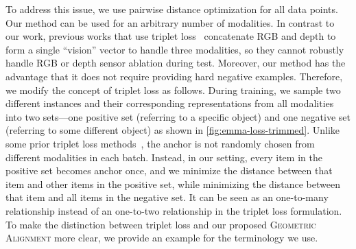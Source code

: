 \documentclass[10pt]{article} %
\newcommand{\todokdinline}[1]{\todo[color=red!20,inline]{{KD: \small #1}}}
\newcommand{\todoffinline}[1]{\todo[inline,color=blue!20]{\small #1 -- Frank}}
\newcommand{\geom}{\textsc{Geometric Alignment}}
\begin{document}
To address this issue, we use pairwise distance optimization for all data points. %
Our method can be used for an arbitrary number of modalities. %
In contrast to our work, previous works that use triplet loss~\citep{GoLD_UMBC,triplet_loss_2021_CVPR} concatenate RGB and depth to form a single ``vision'' vector to handle three modalities, so they cannot robustly handle RGB or depth sensor ablation during test.
Moreover, our method has the advantage that it does not require providing hard negative examples.
Therefore, we modify the concept of triplet loss as follows. During training, we sample two different instances and their corresponding representations from all modalities into two sets---one positive set (referring to a specific object) and one negative set (referring to some different object) as shown in \cref{fig:emma-loss-trimmed}.
Unlike some prior triplet loss methods~\citep{GoLD_UMBC,triplet_loss_2021_CVPR}, the anchor is not randomly chosen from different modalities in each batch. Instead, in our setting, every item in the positive set becomes anchor once, and we minimize the distance between that item and other items in the positive set, while minimizing the distance between that item and all items in the negative set. It can be seen as an one-to-many relationship instead of an one-to-two relationship in the triplet loss formulation.
To make the distinction between triplet loss and our proposed \geom{} more clear, we provide an example for the terminology we use.
\end{document}
